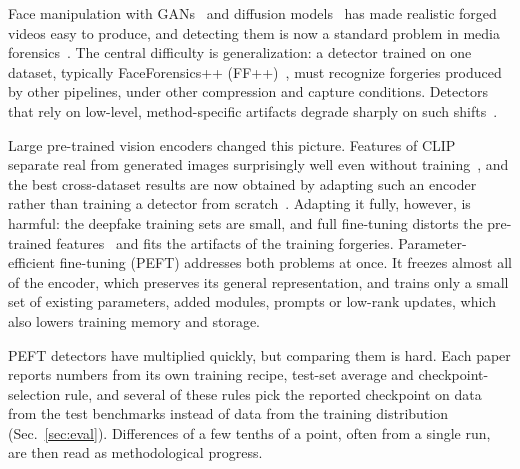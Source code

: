\documentclass[fonts]{icst}
\begin{document}
Face manipulation with GANs~\cite{goodfellow2020gan} and diffusion models~\cite{yang2022diffusion} has made realistic forged videos easy to produce, and detecting them is now a standard problem in media forensics~\cite{pei2024survey,liu2024evolving}. The central difficulty is generalization: a detector trained on one dataset, typically FaceForensics++ (FF++)~\cite{rossler2019ff}, must recognize forgeries produced by other pipelines, under other compression and capture conditions. Detectors that rely on low-level, method-specific artifacts degrade sharply on such shifts~\cite{qian2020frequency,luo2021srm,yan2023deepfakebench}.

Large pre-trained vision encoders changed this picture. Features of CLIP~\cite{radford2021clip_vitl} separate real from generated images surprisingly well even without training~\cite{ojha2023universal,tsai2024trainingfree}, and the best cross-dataset results are now obtained by adapting such an encoder rather than training a detector from scratch~\cite{yan2025effort,yermakov2025gend,cui2025forada}. Adapting it fully, however, is harmful: the deepfake training sets are small, and full fine-tuning distorts the pre-trained features~\cite{kumar2022finetuning} and fits the artifacts of the training forgeries. Parameter-efficient fine-tuning (PEFT) addresses both problems at once. It freezes almost all of the encoder, which preserves its general representation, and trains only a small set of existing parameters, added modules, prompts or low-rank updates, which also lowers training memory and storage.

PEFT detectors have multiplied quickly, but comparing them is hard. Each paper reports numbers from its own training recipe, test-set average and checkpoint-selection rule, and several of these rules pick the reported checkpoint on data from the test benchmarks instead of data from the training distribution (Sec.~\ref{sec:eval}). Differences of a few tenths of a point, often from a single run, are then read as methodological progress.
\end{document}
